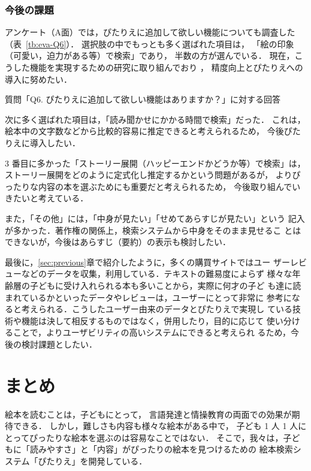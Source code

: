 \documentclass[japanese]{jnlp_1.4}
\begin{document}
\subsubsection{今後の課題}\label{sec:futurewk}



アンケート（A面）では，ぴたりえに追加して欲しい機能についても調査した（表~\ref{tb:eva-Q6}）．
選択肢の中でもっとも多く選ばれた項目は，
「絵の印象（可愛い，迫力がある等）で検索」であり，
半数の方が選んでいる．
現在，こうした機能を実現するための研究に取り組んでおり
\cite{Fujita:etal:2016j}， 
精度向上とぴたりえへの導入に努めたい．

\begin{table}[b]
  \caption{質問「Q6. ぴたりえに追加して欲しい機能はありますか？」に対する回答}
  \label{tb:eva-Q6}

\end{table}

次に多く選ばれた項目は，「読み聞かせにかかる時間で検索」だった．
これは，絵本中の文字数などから比較的容易に推定できると考えられるため，
今後ぴたりえに導入したい．

3 番目に多かった「ストーリー展開（ハッピーエンドかどうか等）で検索」は，
ストーリー展開をどのように定式化し推定するかという問題があるが，
よりぴったりな内容の本を選ぶためにも重要だと考えられるため，
今後取り組んでいきたいと考えている．

また，「その他」には，「中身が見たい」「せめてあらすじが見たい」という
記入が多かった．著作権の関係上，検索システムから中身をそのまま見せるこ
とはできないが，今後はあらすじ（要約）の表示も検討したい．

最後に，\ref{sec:previous}章で紹介したように，多くの購買サイトではユー
ザーレビューなどのデータを収集，利用している．テキストの難易度によらず
様々な年齢層の子どもに受け入れられる本も多いことから，実際に何才の子ど
も達に読まれているかといったデータやレビューは，ユーザーにとって非常に
参考になると考えられる．こうしたユーザー由来のデータとぴたりえで実現し
ている技術や機能は決して相反するものではなく，併用したり，目的に応じて
使い分けることで，よりユーザビリティの高いシステムにできると考えられ
るため，今後の検討課題としたい．



\section{まとめ}\label{sec:conc}


絵本を読むことは，子どもにとって，
言語発達と情操教育の両面での効果が期待できる．
しかし，難しさも内容も様々な絵本がある中で，
子ども 1 人 1 人にとってぴったりな絵本を選ぶのは容易なことではない．
そこで，我々は，子どもに「読みやすさ」と「内容」がぴったりの絵本を見つけるための
絵本検索システム「ぴたりえ」を開発している．
\end{document}

